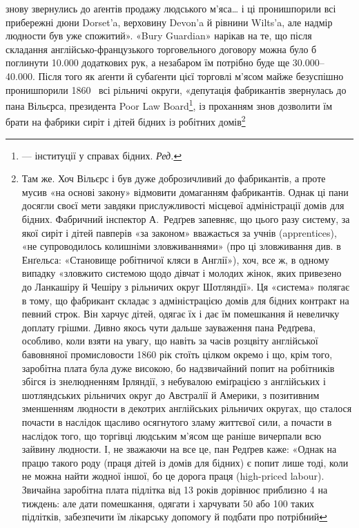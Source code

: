 знову звернулись до аґентів продажу людського м’яса\dots{} і ці пронишпорили
всі прибережні дюни Dorset’a, верховину Devon’a
й рівнини Wilts’a, але надмір людности був уже спожитий».
«Bury Guardian» нарікав на те, що після складання англійсько-французького
торговельного договору можна було б поглинути
\num{10.000} додаткових рук, а незабаром їм потрібно буде ще \num{30.000}--\num{40.000}.
Після того як аґенти й субаґенти цієї торговлі м’ясом
майже безуспішно пронишпорили 1860~ всі рільничі округи,
«депутація фабрикантів звернулась до пана Вільєрса, президента
Poor Law Board\footnote*{
— інституції у справах бідних. \emph{Ред.}
}, із проханням знов дозволити їм брати на
фабрики сиріт і дітей бідних із робітних домів\footnote{
Там же. Хоч Вільєрс і був дуже доброзичливий до фабрикантів,
а проте мусив «на основі закону» відмовити домаганням фабрикантів.
Однак ці пани досягли своєї мети завдяки прислужливості місцевої
адміністрації домів для бідних. Фабричний інспектор А.~Редґрев запевняє,
що цього разу систему, за якої сиріт і дітей павперів «за законом» вважається
за учнів (apprentices), «не супроводилось колишніми зловживаннями»
(про ці зловживання див. в Енґельса: «Становище робітничої
кляси в Англії»), хоч, все ж, в одному випадку «зловжито системою щодо
дівчат і молодих жінок, яких привезено до Ланкашіру й Чешіру з рільничих
округ Шотляндії». Ця «система» полягає в тому, що фабрикант складає
з адміністрацією домів для бідних контракт на певний строк. Він харчує
дітей, одягає їх і дає їм помешкання й невеличку доплату грішми.
Дивно якось чути дальше зауваження пана Редґрева, особливо, коли взяти
на увагу, що навіть за часів розцвіту англійської бавовняної промисловости
1860 рік стоїть цілком окремо і що, крім того, заробітна плата була
дуже високою, бо надзвичайний попит на робітників збігся із знелюдненням
Ірляндії, з небувалою еміґрацією з англійських і шотляндських
рільничих округ до Австралії й Америки, з позитивним зменшенням людности
в декотрих англійських рільничих округах, що сталося почасти в
наслідок щасливо осягнутого зламу життєвої сили, а почасти в наслідок
того, що торгівці людським м’ясом ще раніше вичерпали всю зайвину
людности. І, не зважаючи на все це, пан Редґрев каже: «Однак на працю
такого роду (праця дітей із домів для бідних) є попит лише тоді, коли не
можна найти жодної іншої, бо це дорога праця (high-priced labour).
Звичайна заробітна плата підлітка від 13 років дорівнює приблизно 4
на тиждень: але дати помешкання, одягати і харчувати 50 або 100
таких підлітків, забезпечити їм лікарську допомогу й подбати про потрібний
}
